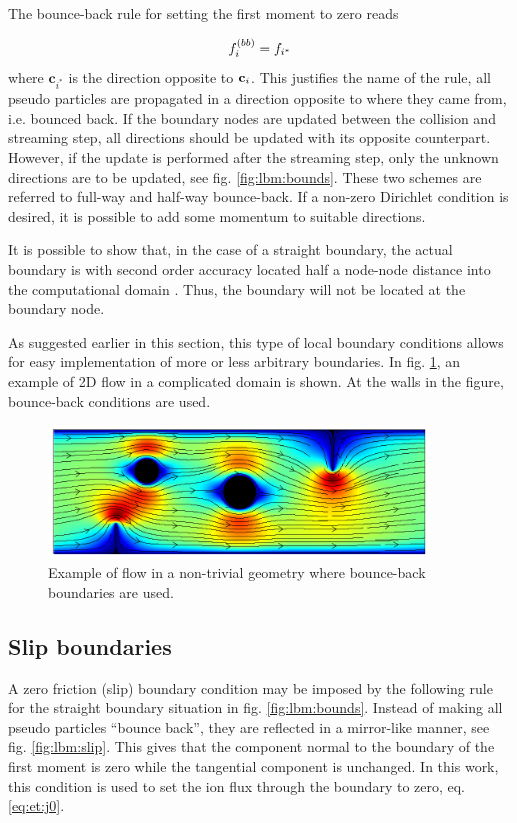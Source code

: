 The bounce-back rule for setting the first moment to zero reads

\begin{equation}
f_i^{(bb)} = f_{i^*}
\end{equation}
where $\mathbf{c}_{i^*}$ is the direction opposite to $\mathbf{c}_i$. This
justifies the name of the rule, all pseudo particles are propagated in
a direction opposite to where they came from, i.e. bounced back. If
the boundary nodes are updated between the collision and streaming
step, all directions should be updated with its opposite
counterpart. However, if the update is performed after the streaming
step, only the unknown directions are to be updated, see
fig. \ref{fig:lbm:bounds}. These two schemes are referred to full-way
and half-way bounce-back. If a non-zero Dirichlet condition is
desired, it is possible to add some momentum to suitable directions.

It is possible to show that, in the case of a straight boundary, the
actual boundary is with second order accuracy located half a node-node
distance into the computational domain \cite{junk-boundary}. Thus, the
boundary will not be located at the boundary node. 

As suggested earlier in this section, this type of local boundary
conditions allows for easy implementation of more or less arbitrary
boundaries. In fig. \ref{fig:lbm:cool_flow}, an example of 2D flow in a
complicated domain is shown. At the walls in the figure, bounce-back
conditions are used.

\begin{figure}
\begin{center}
\includegraphics[width=0.9\textwidth]{fig/comp_bound_u.pdf}
\end{center}
\caption[Example of flow in a non-trivial geometry.]{Example of flow
  in a non-trivial geometry where bounce-back boundaries are used.}
\label{fig:lbm:cool_flow}
\end{figure}

\subsection{Slip boundaries}\label{sec:lbm:mirror}
A zero friction (slip) boundary condition may be imposed by the
following rule for the straight boundary situation in
fig. \ref{fig:lbm:bounds}. Instead of making all pseudo particles
``bounce back'', they are reflected in a mirror-like manner, see
fig. \ref{fig:lbm:slip}. This gives that the component normal to the
boundary of the first moment is zero while the tangential component is
unchanged. In this work, this condition is used to set the
ion flux through the boundary to zero, eq. \eqref{eq:et:j0}.

